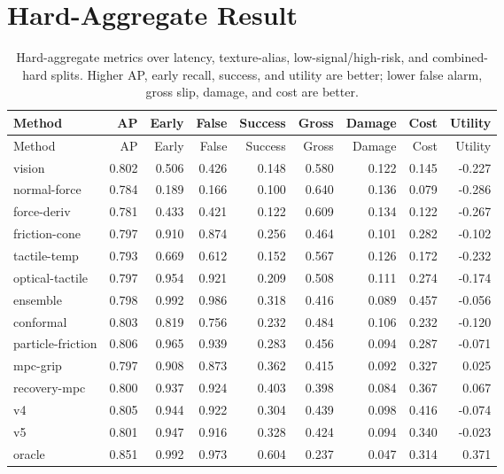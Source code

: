 \documentclass{article}
\begin{document}
\section{Hard-Aggregate Result}

\begin{longtable}{@{}lrrrrrrrr@{}}
\caption{Hard-aggregate metrics over latency, texture-alias, low-signal/high-risk, and combined-hard splits. Higher AP, early recall, success, and utility are better; lower false alarm, gross slip, damage, and cost are better.}\\
\toprule
Method & AP & Early & False & Success & Gross & Damage & Cost & Utility \\
\midrule
\endfirsthead
\toprule
Method & AP & Early & False & Success & Gross & Damage & Cost & Utility \\
\midrule
\endhead
vision & 0.802 & 0.506 & 0.426 & 0.148 & 0.580 & 0.122 & 0.145 & -0.227 \\
normal-force & 0.784 & 0.189 & 0.166 & 0.100 & 0.640 & 0.136 & 0.079 & -0.286 \\
force-deriv & 0.781 & 0.433 & 0.421 & 0.122 & 0.609 & 0.134 & 0.122 & -0.267 \\
friction-cone & 0.797 & 0.910 & 0.874 & 0.256 & 0.464 & 0.101 & 0.282 & -0.102 \\
tactile-temp & 0.793 & 0.669 & 0.612 & 0.152 & 0.567 & 0.126 & 0.172 & -0.232 \\
optical-tactile & 0.797 & 0.954 & 0.921 & 0.209 & 0.508 & 0.111 & 0.274 & -0.174 \\
ensemble & 0.798 & 0.992 & 0.986 & 0.318 & 0.416 & 0.089 & 0.457 & -0.056 \\
conformal & 0.803 & 0.819 & 0.756 & 0.232 & 0.484 & 0.106 & 0.232 & -0.120 \\
particle-friction & 0.806 & 0.965 & 0.939 & 0.283 & 0.456 & 0.094 & 0.287 & -0.071 \\
mpc-grip & 0.797 & 0.908 & 0.873 & 0.362 & 0.415 & 0.092 & 0.327 & 0.025 \\
recovery-mpc & 0.800 & 0.937 & 0.924 & 0.403 & 0.398 & 0.084 & 0.367 & 0.067 \\
v4 & 0.805 & 0.944 & 0.922 & 0.304 & 0.439 & 0.098 & 0.416 & -0.074 \\
v5 & 0.801 & 0.947 & 0.916 & 0.328 & 0.424 & 0.094 & 0.340 & -0.023 \\
oracle & 0.851 & 0.992 & 0.973 & 0.604 & 0.237 & 0.047 & 0.314 & 0.371 \\
\bottomrule
\end{longtable}
\end{document}
